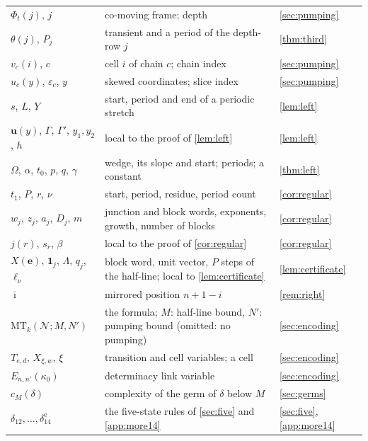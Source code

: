 {\begin{longtable}{@{}p{}>{\raggedright\arraybackslash}p{}>{\raggedright\arraybackslash}p{}@{}}
$\Phi_t(j)$, $j$ & co-moving frame; depth & \cref{sec:pumping}\\
$\theta(j)$, $P_j$ & transient and a period of the depth-row $j$ & \cref{thm:third}\\
$v_c(i)$, $c$ & cell $i$ of chain $c$; chain index & \cref{sec:pumping}\\
$u_c(y)$, $\varepsilon_c$, $y$ & skewed coordinates; slice index & \cref{sec:pumping}\\
$s$, $L$, $Y$ & start, period and end of a periodic stretch & \cref{lem:left}\\
$\mathbf u(y)$, $\Gamma$, $\Gamma'$, $y_1,y_2$, $h$ & local to the proof of \cref{lem:left} & \cref{lem:left}\\
$\Omega$, $\alpha$, $t_0$, $p$, $q$, $\gamma$ & wedge, its slope and start; periods; a constant & \cref{thm:left}\\
$t_1$, $P$, $r$, $\nu$ & start, period, residue, period count & \cref{cor:regular}\\
$w_j$, $z_j$, $a_j$, $D_j$, $m$ & junction and block words, exponents, growth, number of blocks & \cref{cor:regular}\\
$j(r)$, $s_r$, $\beta$ & local to the proof of \cref{cor:regular} & \cref{cor:regular}\\
$X(\mathbf e)$, $\mathbf 1_j$, $\Lambda$, $q_j$, $\ell_\nu$ & block word, unit vector, $P$ steps of the half-line; local to \cref{lem:certificate} & \cref{lem:certificate}\\
$\bar\imath$ & mirrored position $n+1-i$ & \cref{rem:right}\\
$\mathrm{MT}_k(\mathcal N;M,N')$ & the formula; $M$: half-line bound, $N'$: pumping bound (omitted: no pumping) & \cref{sec:encoding}\\
$T_{e,d}$, $X_{\xi,w}$, $\xi$ & transition and cell variables; a cell & \cref{sec:encoding}\\
$E_{n,n'}(\kappa_0)$ & determinacy link variable & \cref{sec:encoding}\\
$c_M(\delta)$ & complexity of the germ of $\delta$ below $M$ & \cref{sec:germs}\\
$\delta_{12},\dots,\delta_{14}^{\mathrm e}$ & the five-state rules of \cref{sec:five} and \cref{app:more14} & \cref{sec:five}, \cref{app:more14}\\
\end{longtable}}
